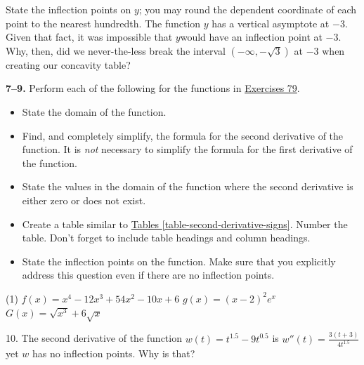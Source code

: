 \documentclass[10pt,oneside,]{book}
\theoremstyle{plain}
\theoremstyle{definition}
\numberwithin{equation}{section}
\newcommand{\fe}[2]{#1\mathopen{}\left(#2\right)\mathclose{}}
\newcommand{\ointerval}[2]{\left(#1,#2\right)}
\newcommand{\sd}[1]{#1''}
\begin{document}
\begin{exerciselist}
\begin{exercisegroup}
\exercise[5.]\hypertarget{exercise-602}{\null}State the inflection points on \(y\); you may round the dependent coordinate of each point to the nearest hundredth.%
\exercise[6.]\hypertarget{exercise-603}{\null}The function \(y\) has a vertical asymptote at \(-3\).  Given that fact, it was impossible that \(y\)would have an inflection point at \(-3\).  Why, then, did we never-the-less break the interval \(\ointerval{-\infty}{-\sqrt{3}}\) at \(-3\) when creating our concavity table?%
\end{exercisegroup}
\par\smallskip\noindent
\textbf{7--9. }\hypertarget{exercisegroup-118}{\null}Perform each of the following for the functions in \hyperlink{exercise-make-second-derivative-table-first}{Exercises 7}\textendash{}\hyperlink{exercise-make-second-derivative-table-last}{9}.%
\begin{itemize}[label=\textbullet]
\item{}State the domain of the function.\item{}Find, and completely simplify, the formula for the second derivative of the function. It is \emph{not} necessary to simplify the formula for the first derivative of the function.\item{}State the values in the domain of the function where the second derivative is either zero or does not exist.\item{}Create a table similar to \hyperref[table-second-derivative-signs]{Tables \ref{table-second-derivative-signs}}.  Number the table.  Don't forget to include table headings and column headings.\item{}State the inflection points on the function.  Make sure that you explicitly address this question even if there are no inflection points.\end{itemize}
\par
\begin{exercisegroup}(1)
\exercise[7.]\hypertarget{exercise-make-second-derivative-table-first}{\null}\(\fe{f}{x}=x^4-12x^3+54x^2-10x+6\)%
\exercise[8.]\hypertarget{exercise-605}{\null}\(\fe{g}{x}=(x-2)^2e^x\)%
\exercise[9.]\hypertarget{exercise-make-second-derivative-table-last}{\null}\(\fe{G}{x}=\sqrt{x^3}+6\sqrt{x}\)%
\end{exercisegroup}
\par\smallskip\noindent
\item[10.]\hypertarget{exercise-607}{\null}The second derivative of the function \(\fe{w}{t}=t^{1.5}-9t^{0.5}\) is \(\fe{\sd{w}}{t}=\frac{3(t+3)}{4t^{1.5}}\) yet \(w\) has no inflection points. Why is that?%
\par\smallskip
\end{exerciselist}
\typeout{************************************************}
\typeout{************************************************}
\end{document}
